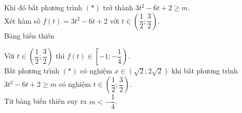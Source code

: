 \begin{ex}
{\begin{itemchoice}
   Khi đó bất phương trình $\left(*\right)$ trở thành $3t^2-6t+2\ge  m$.\\
   Xét  hàm số $f(t)=3t^2-6t+2$ với $t\in \left(\dfrac{1}{2}; \dfrac{3}{2} \right)$.\\
    Bảng biến thiên
   \begin{center}
   \end{center}
   Với $t\in \left(\dfrac{1}{2}; \dfrac{3}{2} \right)$ thì $f(t)\in  \left[-1;-\dfrac{1}{4} \right)$.\\
   Bất phương trình $\left(*\right)$ có nghiệm  $x\in \left(\sqrt{2}; 2\sqrt{2} \right)$ khi bất phương trình $3t^2-6t+2\ge m$ có nghiệm $t\in \left(\dfrac{1}{2}; \dfrac{3}{2} \right)$.\\
   Từ bảng biến thiên suy  ra $m <-\dfrac{1}{4}$.
  \end{itemchoice}
 } 
\end{ex}

